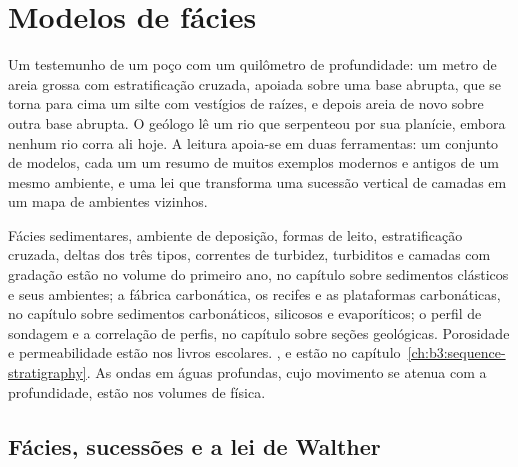 \chapter{Modelos de fácies}\label{ch:b3:facies-models}

Um testemunho de um poço com um quilômetro de profundidade: um metro de areia grossa com
estratificação cruzada, apoiada sobre uma base abrupta, que se torna para cima um silte com
vestígios de raízes, e depois areia de novo sobre outra base abrupta. O geólogo lê um rio que
serpenteou por sua planície, embora nenhum rio corra ali hoje. A leitura apoia-se em duas
ferramentas: um conjunto de modelos, cada um um resumo de muitos exemplos modernos e antigos
de um mesmo ambiente, e uma lei que transforma uma sucessão vertical de camadas em um mapa
de ambientes vizinhos.

\begin{recall}
Fácies sedimentares, ambiente de deposição, formas de leito, estratificação cruzada,
deltas dos três tipos, correntes de turbidez, turbiditos e camadas com gradação estão no
volume do primeiro ano, no capítulo sobre sedimentos clásticos e seus ambientes; a fábrica
carbonática, os recifes e as plataformas carbonáticas, no capítulo sobre sedimentos
carbonáticos, silicosos e evaporíticos; o perfil de sondagem e a correlação de perfis, no
capítulo sobre seções geológicas. Porosidade e
permeabilidade estão nos livros escolares. ,  e
 estão no capítulo~\ref{ch:b3:sequence-stratigraphy}. As ondas em águas profundas, cujo
movimento se atenua com a profundidade, estão nos volumes de física.
\end{recall}

\section{Fácies, sucessões e a lei de Walther}\label{sec:b3:facies-models:walther}

